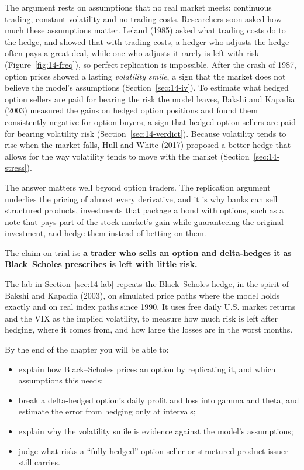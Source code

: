 The argument rests on assumptions that no real market meets: continuous trading, constant volatility and no trading costs. Researchers soon asked how much these assumptions matter. Leland (1985) asked what trading costs do to the hedge, and showed that with trading costs, a hedger who adjusts the hedge often pays a great deal, while one who adjusts it rarely is left with risk (Figure~\ref{fig:14-freq}), so perfect replication is impossible. After the crash of 1987, option prices showed a lasting \emph{volatility smile}, a sign that the market does not believe the model's assumptions (Section~\ref{sec:14-iv}). To estimate what hedged option sellers are paid for bearing the risk the model leaves, Bakshi and Kapadia (2003) measured the gains on hedged option positions and found them consistently negative for option buyers, a sign that hedged option sellers are paid for bearing volatility risk (Section~\ref{sec:14-verdict}). Because volatility tends to rise when the market falls, Hull and White (2017) proposed a better hedge that allows for the way volatility tends to move with the market (Section~\ref{sec:14-stress}).



The answer matters well beyond option traders. The replication argument underlies the pricing of almost every derivative, and it is why banks can sell structured products, investments that package a bond with options, such as a note that pays part of the stock market's gain while guaranteeing the original investment, and hedge them instead of betting on them. 

The claim on trial is: \textbf{a trader who sells an option and delta-hedges it as Black--Scholes prescribes is left with little risk.}

The lab in Section~\ref{sec:14-lab} repeats the Black--Scholes hedge, in the spirit of Bakshi and Kapadia (2003), on simulated price paths where the model holds exactly and on real index paths since 1990. It uses free daily U.S. market returns and the VIX as the implied volatility, to measure how much risk is left after hedging, where it comes from, and how large the losses are in the worst months.

By the end of the chapter you will be able to:

\begin{itemize}
  \item explain how Black--Scholes prices an option by replicating it, and which assumptions this needs;
  \item break a delta-hedged option's daily profit and loss into gamma and theta, and estimate the error from hedging only at intervals;
  \item explain why the volatility smile is evidence against the model's assumptions;
  \item judge what risks a ``fully hedged'' option seller or structured-product issuer still carries.
\end{itemize}






